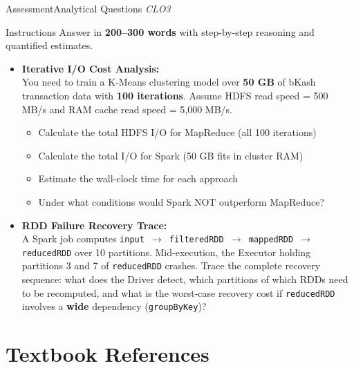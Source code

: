 \documentclass[aspectratio=169,10pt]{beamer}
\begin{document}
\begin{frame}{Assessment\textemdash Analytical Questions \hfill\small\textit{CLO3}}
  \begin{block}{Instructions}
    Answer in \textbf{200--300 words} with step-by-step reasoning and quantified estimates.
  \end{block}
  \vspace{6pt}
  \begin{itemize}
    \item[\textbf{A1.}] \textbf{Iterative I/O Cost Analysis:}\\
    You need to train a K-Means clustering model over \textbf{50 GB} of bKash transaction data with \textbf{100 iterations}.  Assume HDFS read speed = 500 MB/s and RAM cache read speed = 5{,}000 MB/s.
    \begin{itemize}
      \item Calculate the total HDFS I/O for MapReduce (all 100 iterations)
      \item Calculate the total I/O for Spark (50 GB fits in cluster RAM)
      \item Estimate the wall-clock time for each approach
      \item Under what conditions would Spark NOT outperform MapReduce?
    \end{itemize}
  \end{itemize}
  \vspace{6pt}
  \begin{itemize}
    \item[\textbf{A2.}] \textbf{RDD Failure Recovery Trace:}\\
    A Spark job computes \texttt{input $\to$ filteredRDD $\to$ mappedRDD $\to$ reducedRDD} over 10 partitions.  Mid-execution, the Executor holding partitions 3 and 7 of \texttt{reducedRDD} crashes.  Trace the complete recovery sequence: what does the Driver detect, which partitions of which RDDs need to be recomputed, and what is the worst-case recovery cost if \texttt{reducedRDD} involves a \textbf{wide} dependency (\texttt{groupByKey})?
  \end{itemize}
\end{frame}

\section*{Textbook References}
\end{document}
